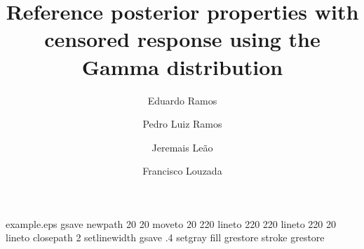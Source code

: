 \begin{filecontents*}{example.eps}
gsave
newpath
  20 20 moveto
  20 220 lineto
  220 220 lineto
  220 20 lineto
closepath
2 setlinewidth
gsave
  .4 setgray fill
grestore
stroke
grestore
\end{filecontents*}
%
\documentclass[smallextended,natbib,runningheads]{svjour3}
%
%
\smartqed  %
%
\usepackage{amsmath}
\usepackage{amssymb}
\usepackage{graphicx}
\usepackage{epstopdf}%
\usepackage{subfigure}%
\usepackage{multirow}
\usepackage{float}
\usepackage{xcolor}
\usepackage{comment}
\usepackage{natbib}%
\newcommand{\f}{\operatorname}
\newcommand{\R}{\mathbb{R}}
\newcommand{\N}{\mathbb{N}}
\newcommand{\bs}{\boldsymbol}

%
%
%


\title{Reference posterior properties with censored response using the Gamma distribution
}



\author{Eduardo Ramos         \and
        Pedro Luiz Ramos \and Jeremais Leão \and Francisco Louzada%
}






